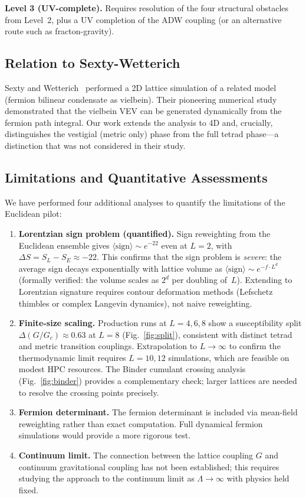 \documentclass[aps,prd,twocolumn,superscriptaddress,nofootinbib]{revtex4-2}
\newcommand{\Gc}{G_c}
\begin{document}
\textbf{Level 3 (UV-complete).} Requires resolution of the four
structural obstacles from Level~2, plus a UV completion of the ADW
coupling (or an alternative route such as fracton-gravity).

\subsection{Relation to Sexty-Wetterich}

Sexty and Wetterich~\cite{Sexty2013} performed a 2D lattice simulation
of a related model (fermion bilinear condensate as vielbein). Their
pioneering numerical study demonstrated that the vielbein VEV can be
generated dynamically from the fermion path integral. Our work extends
the analysis to 4D and, crucially, distinguishes the vestigial (metric
only) phase from the full tetrad phase---a distinction that was not
considered in their study.

\subsection{Limitations and Quantitative Assessments}

We have performed four additional analyses to quantify the limitations
of the Euclidean pilot:

\begin{enumerate}
\item \textbf{Lorentzian sign problem (quantified).} Sign reweighting
  from the Euclidean ensemble gives $\langle\text{sign}\rangle \sim
  e^{-22}$ even at $L=2$, with $\Delta S = S_L - S_E \approx -22$.
  This confirms that the sign problem is \emph{severe}: the average
  sign decays exponentially with lattice volume as $\langle\text{sign}
  \rangle \sim e^{-f \cdot L^d}$ (formally verified: the volume scales
  as $2^d$ per doubling of~$L$). Extending to Lorentzian signature
  requires contour deformation methods (Lefschetz thimbles or complex
  Langevin dynamics), not naive reweighting.

\item \textbf{Finite-size scaling.} Production runs at $L = 4, 6, 8$
  show a susceptibility split $\Delta(G/\Gc) \approx 0.63$ at $L = 8$
  (Fig.~\ref{fig:split}), consistent with distinct tetrad and metric
  transition couplings. Extrapolation to $L \to \infty$ to confirm
  the thermodynamic limit requires $L = 10, 12$ simulations, which
  are feasible on modest HPC resources. The Binder cumulant crossing
  analysis (Fig.~\ref{fig:binder}) provides a complementary check;
  larger lattices are needed to resolve the crossing points precisely.

\item \textbf{Fermion determinant.} The fermion determinant is
  included via mean-field reweighting rather than exact computation.
  Full dynamical fermion simulations would provide a more rigorous test.

\item \textbf{Continuum limit.} The connection between the lattice
  coupling $G$ and continuum gravitational coupling has not been
  established; this requires studying the approach to the continuum
  limit as $\Lambda \to \infty$ with physics held fixed.
\end{enumerate}
\end{document}
